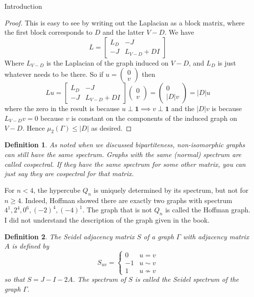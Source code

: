 \documentclass{article}
\newtheorem{defn}{Definition}
\begin{document}
\begin{section}{Introduction}
\begin{proof}
    This is easy to see by writing out the Laplacian as a block matrix, where the first block corresponds to $D$ and the latter $V - D$.
    We have
    $$
    L = \begin{bmatrix}
      L_D & -J \\
      -J & L_{V-D} + DI
    \end{bmatrix}
    $$
    Where $L_{V-D}$ is the Laplacian of the graph induced on $V-D$, and $L_D$ is just whatever needs to be there.
    So if $u = \begin{pmatrix} 0 \\ v\end{pmatrix}$ then
      $$
      Lu = 
      \begin{bmatrix}
      L_D & -J \\
      -J & L_{V-D} + DI
      \end{bmatrix}
      \begin{pmatrix}
	0 \\ v
      \end{pmatrix}
      =
      \begin{pmatrix}
	0 \\ |D|v
      \end{pmatrix}
      =
      |D|u
      $$
      where the zero in the result is because $u \perp \mathbf 1 \implies v \perp \mathbf 1$ and the $|D|v$ is because $L_{V-D}v = 0$ because $v$ is constant on the components of the induced graph on $V-D$.
      Hence $\mu_2(\Gamma) \leq |D|$ as desired.
  \end{proof}

  \begin{defn}
  As noted when we discussed bipartiteness, non-isomorphic graphs can still have the same spectrum.
  Graphs with the same (normal) spectrum are called \emph{cospectral}.
  If they have the same spectrum for some other matrix, you can just say they are cospectral for that matrix.
  \end{defn}

  For $n < 4$, the hypercube $Q_n$ is uniquely determined by its spectrum, but not for $n \geq 4$.
  Indeed, Hoffman showed there are exactly two graphs with spectrum $4^1, 2^4, 0^6, (-2)^4, (-4)^1$.
  The graph that is not $Q_n$ is called the Hoffman graph.
  I did not understand the description of the graph given in the book.

  \begin{defn}
    The \emph{Seidel adjacency matrix} $S$ of a graph $\Gamma$ with adjacency matrix $A$ is defined by
    $$
    S_{uv} = \begin{cases}
      0 & u = v\\
      -1 & u \sim v\\
      1 & u \not \sim v
    \end{cases}
    $$
    so that $S = J - I - 2A$.
    The spectrum of $S$ is called the \emph{Seidel spectrum} of the graph $\Gamma$.
  \end{defn}


\end{section}
\end{document}
